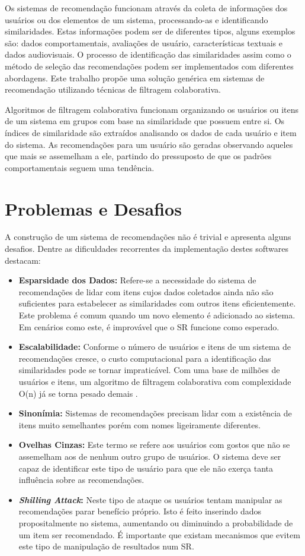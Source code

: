 \documentclass[
	12pt,				%
    oneside,			%
	a4paper,			%
	english,			%
	french,				%
	spanish,			%
	brazil,				%
	]{abntex2}
\begin{document}
Os sistemas de recomendação funcionam através da coleta de informações dos usuários ou dos elementos de um sistema, processando-as e 
identificando similaridades. Estas informações podem ser de diferentes tipos, alguns exemplos são: dados comportamentais, avaliações de usuário,
características textuais e dados audiovisuais. O processo de identificação das similaridades assim como o método de seleção das recomendações podem 
ser implementados com diferentes abordagens. Este trabalho propõe uma solução genérica em sistemas de recomendação utilizando técnicas de filtragem colaborativa.

Algoritmos de filtragem colaborativa funcionam organizando os usuários ou itens de um sistema em grupos com base na similaridade que possuem entre si.
Os índices de similaridade são extraídos analisando os dados de cada usuário e item do sistema. As recomendações para um usuário são geradas observando
aqueles que mais se assemelham a ele, partindo do pressuposto de que os padrões comportamentais seguem uma tendência. 

\section{Problemas e Desafios}
A construção de um sistema de recomendações não é trivial e apresenta alguns desafios. Dentre as dificuldades recorrentes da 
implementação destes softwares  destacam:

\begin{itemize}
	\item \textbf{Esparsidade dos Dados:} Refere-se a necessidade do sistema de recomendações de lidar com itens cujos dados coletados ainda não são
	suficientes para estabelecer as similaridades com outros itens eficientemente. Este problema é comum quando um novo elemento é adicionado ao sistema. Em cenários
	como este, é improvável que o SR funcione como esperado.
	\item \textbf{Escalabilidade:} Conforme o número de usuários e itens de um sistema de recomendações cresce, o custo computacional para a identificação
	das similaridades pode se tornar impraticável. Com uma base de milhões de usuários e itens, um algoritmo de filtragem colaborativa com complexidade O(n)
	já se torna pesado demais \cite{2-CFSurvey}. 
	\item \textbf{Sinonímia:} Sistemas de recomendações precisam lidar com a existência de itens muito semelhantes porém com nomes ligeiramente diferentes.
	\item \textbf{Ovelhas Cinzas:} Este termo se refere aos usuários com gostos que não se assemelham aos de nenhum outro grupo de usuários. O sistema deve
	ser capaz de identificar este tipo de usuário para que ele não exerça tanta influência sobre as recomendações.
	\item \textbf{\textit{Shilling Attack}:} Neste tipo de ataque os usuários tentam manipular as recomendações parar benefício
	próprio. Isto é feito inserindo dados propositalmente no sistema, aumentando ou diminuindo a probabilidade de um item ser recomendado. É importante que existam
	mecanismos que evitem este tipo de manipulação de resultados num SR.
\end{itemize}
\end{document}
